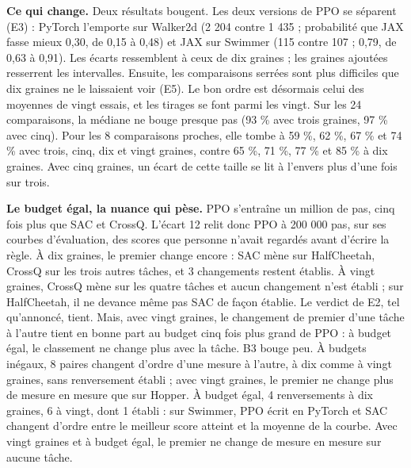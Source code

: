 \documentclass[11pt,a4paper]{article}
\begin{document}
\textbf{Ce qui change.} Deux résultats bougent. Les deux versions de PPO
se séparent (E3) : PyTorch l'emporte sur Walker2d (2 204 contre 1 435 ;
probabilité que JAX fasse mieux 0,30, de 0,15 à 0,48) et JAX sur Swimmer
(115 contre 107 ; 0,79, de 0,63 à 0,91). Les écarts ressemblent à ceux
de dix graines ; les graines ajoutées resserrent les intervalles.
Ensuite, les comparaisons serrées sont plus difficiles que dix graines
ne le laissaient voir (E5). Le bon ordre est désormais celui des
moyennes de vingt essais, et les tirages se font parmi les vingt. Sur
les 24 comparaisons, la médiane ne bouge presque pas (93 \% avec trois
graines, 97 \% avec cinq). Pour les 8 comparaisons proches, elle tombe à
59 \%, 62 \%, 67 \% et 74 \% avec trois, cinq, dix et vingt graines,
contre 65 \%, 71 \%, 77 \% et 85 \% à dix graines. Avec cinq graines, un
écart de cette taille se lit à l'envers plus d'une fois sur trois.

\textbf{Le budget égal, la nuance qui pèse.} PPO s'entraîne un million
de pas, cinq fois plus que SAC et CrossQ. L'écart 12 relit donc PPO à
200 000 pas, sur ses courbes d'évaluation, des scores que personne
n'avait regardés avant d'écrire la règle. À dix graines, le premier
change encore : SAC mène sur HalfCheetah, CrossQ sur les trois autres
tâches, et 3 changements restent établis. À vingt graines, CrossQ mène
sur les quatre tâches et aucun changement n'est établi ; sur
HalfCheetah, il ne devance même pas SAC de façon établie. Le verdict de
E2, tel qu'annoncé, tient. Mais, avec vingt graines, le changement de
premier d'une tâche à l'autre tient en bonne part au budget cinq fois
plus grand de PPO : à budget égal, le classement ne change plus avec la
tâche. B3 bouge peu. À budgets inégaux, 8 paires changent d'ordre d'une
mesure à l'autre, à dix comme à vingt graines, sans renversement établi
; avec vingt graines, le premier ne change plus de mesure en mesure que
sur Hopper. À budget égal, 4 renversements à dix graines, 6 à vingt,
dont 1 établi : sur Swimmer, PPO écrit en PyTorch et SAC changent
d'ordre entre le meilleur score atteint et la moyenne de la courbe. Avec
vingt graines et à budget égal, le premier ne change de mesure en mesure
sur aucune tâche.
\end{document}
